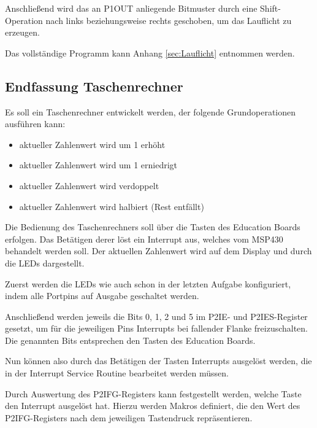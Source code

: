 \documentclass[12pt,a4paper,bibliography=totocnumbered,listof=totocnumbered]{scrartcl}
\begin{document}
\vspace{1em}


Anschließend wird das an P1OUT anliegende Bitmuster durch eine Shift-Operation nach links beziehungsweise rechts geschoben, um das Lauflicht zu erzeugen.

\vspace{1em}


Das vollständige Programm kann Anhang \ref{sec:Lauflicht} entnommen werden.

\pagebreak

\subsection{Endfassung Taschenrechner}
\label{Taschenrechner}
Es soll ein Taschenrechner entwickelt werden, der folgende Grundoperationen ausführen kann:
\begin{itemize}
	\item aktueller Zahlenwert wird um 1 erhöht
	\item aktueller Zahlenwert wird um 1 erniedrigt
	\item aktueller Zahlenwert wird verdoppelt
	\item aktueller Zahlenwert wird halbiert (Rest entfällt)
\end{itemize}
Die Bedienung des Taschenrechners soll über die Tasten des Education Boards erfolgen. Das Betätigen derer löst ein Interrupt aus, welches vom MSP430 behandelt werden soll. Der aktuellen Zahlenwert wird auf dem Display und durch die LEDs dargestellt.

Zuerst werden die LEDs wie auch schon in der letzten Aufgabe konfiguriert, indem alle Portpins auf Ausgabe geschaltet werden.

Anschließend werden jeweils die Bits 0, 1, 2 und 5 im P2IE- und P2IES-Register gesetzt, um für die jeweiligen Pins Interrupts bei fallender Flanke freizuschalten. Die genannten Bits entsprechen den Tasten des Education Boards.

\vspace{1em}


Nun können also durch das Betätigen der Tasten Interrupts ausgelöst werden, die in der Interrupt Service Routine bearbeitet werden müssen.

Durch Auswertung des P2IFG-Registers kann festgestellt werden, welche Taste den Interrupt ausgelöst hat. Hierzu werden Makros definiert, die den Wert des P2IFG-Registers nach dem jeweiligen Tastendruck repräsentieren.
\end{document}
